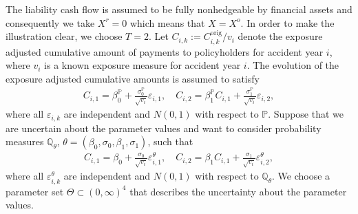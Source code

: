 \documentclass[11pt,a4paper]{article}
\renewcommand{\P}{\mathbb{P}}
\newcommand{\Q}{\mathbb{Q}}
\begin{document}
The liability cash flow is assumed to be fully nonhedgeable by financial assets and consequently we take $X^{r}=0$ which means that $X=X^{o}$. In order to make the illustration clear, we choose $T=2$. Let $C_{i,k}:=C_{i,k}^{\text{orig}}/v_i$ denote the exposure adjusted cumulative amount of payments to policyholders for accident year $i$, where $v_i$ is a known exposure measure for accident year $i$. 
The evolution of the exposure adjusted cumulative amounts is assumed to satisfy 
\begin{align*}
C_{i,1}=\beta_0^{\P}+\frac{\sigma_0^{\P}}{\sqrt{v_i}}\varepsilon_{i,1}, \quad 
C_{i,2}=\beta_1^{\P}C_{i,1}+\frac{\sigma_1^{\P}}{\sqrt{v_i}}\varepsilon_{i,2}, 
\end{align*}
where all $\varepsilon_{i,k}$ are independent and $N(0,1)$ with respect to $\P$. Suppose that we are uncertain about the parameter values and want to consider probability measures $\Q_{\theta}$, $\theta=(\beta_0,\sigma_0,\beta_1,\sigma_1)$, such that 
\begin{align*}
C_{i,1}=\beta_0+\frac{\sigma_0}{\sqrt{v_i}}\varepsilon_{i,1}^{\theta}, \quad
C_{i,2}=\beta_1C_{i,1}+\frac{\sigma_1}{\sqrt{v_i}}\varepsilon_{i,2}^{\theta}, 
\end{align*}
where all $\varepsilon_{i,k}^{\theta}$ are independent and $N(0,1)$ with respect to $\Q_{\theta}$. We choose a parameter set $\Theta\subset (0,\infty)^{4}$ that describes the uncertainty about the parameter values. 
\end{document}
